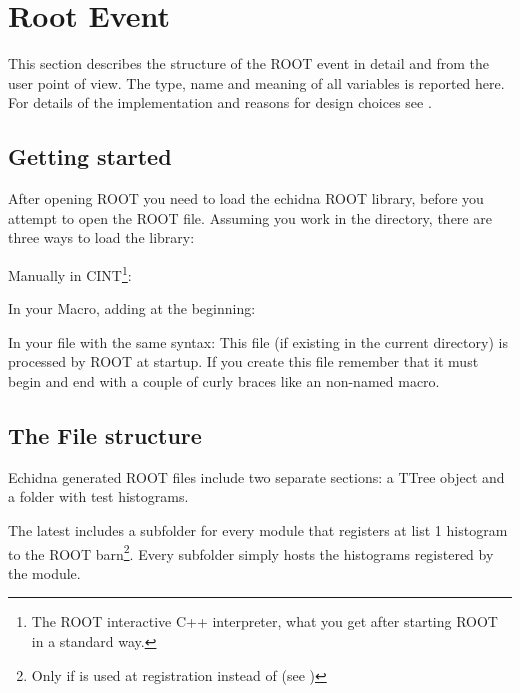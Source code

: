 \section{Root Event}
\label{sec:root_event_for_users}

This section describes the structure of the ROOT event in detail and from the user point of view.
The type, name and meaning of all variables is reported here.
For details of the implementation and reasons for design choices see .

\subsection{Getting started}

After opening ROOT you need to load the echidna ROOT library, before you attempt to open the ROOT file.
Assuming you work in the  directory, there are three ways to load the library:
\ben
\item Manually in CINT\footnote{The ROOT interactive C++ interpreter, what you get after starting ROOT in a standard way.}:

\item In your Macro, adding at the beginning:

\item In your  file with the same syntax:
This file (if existing in the current directory) is processed by ROOT at startup.
  If you create this file remember that it must begin and end with a couple of curly braces like an non-named macro.
\een


\subsection{The File structure}

Echidna generated ROOT files include two separate sections: a TTree object and a folder with test histograms.

The latest includes a subfolder for every module that registers at list 1 histogram to the ROOT barn\footnote{
Only if  is used at registration instead of  (see )}. 
Every subfolder simply hosts the histograms registered by the module.

